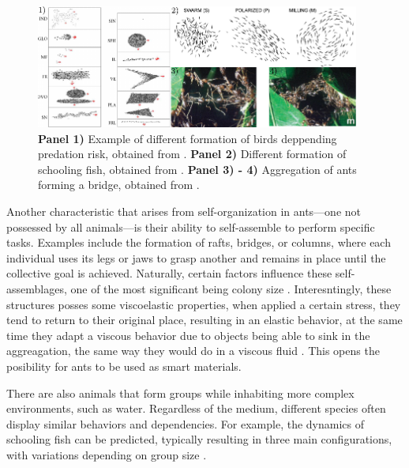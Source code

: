 \begin{figure}
  \begin{center}
    \includegraphics[width=0.95\textwidth]{figures/macroscopicagents.pdf}
  \end{center}
  \caption[Macroscopic Agents example]{\textbf{Panel 1)} Example of different formation of birds deppending predation risk, obtained from \cite{carere2009aerial}. \textbf{Panel 2)} Different formation of schooling fish, obtained from \cite{tunstrom2013collective}. \textbf{Panel 3) - 4)} Aggregation of ants forming a bridge, obtained from \cite{anderson2002self}.}\label{fig:macroscopicagents}
\end{figure}


Another characteristic that arises from self-organization in ants—one not possessed by all animals—is their ability to self-assemble to perform specific tasks. Examples include the formation of rafts, bridges, or columns, where each individual uses its legs or jaws to grasp another and remains in place until the collective goal is achieved. Naturally, certain factors influence these self-assemblages, one of the most significant being colony size \cite{anderson2002self}. Interesntingly, these structures posses some viscoelastic properties, when applied a certain stress, they tend to return to their original place, resulting in an elastic behavior, at the same time they adapt a viscous behavior due to objects being able to sink in the aggreagation, the same way they would do in a viscous fluid \cite{tennenbaum2016mechanics}. This opens the posibility for ants to be used as smart materials. 

There are also animals that form groups while inhabiting more complex environments, such as water. Regardless of the medium, different species often display similar behaviors and dependencies. For example, the dynamics of schooling fish can be predicted, typically resulting in three main configurations, with variations depending on group size \cite{tunstrom2013collective, katz2011inferring, huang2024collective}.

